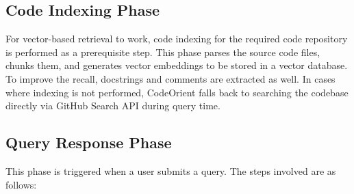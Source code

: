 \subsection{Code Indexing Phase}
For vector-based retrieval to work, code indexing for the required code repository is performed as a prerequisite step. This phase parses the source code files, chunks them, and generates vector embeddings to be stored in a vector database. To improve the recall, docstrings and comments are extracted as well. In cases where indexing is not performed, CodeOrient falls back to searching the codebase directly via GitHub Search API during query time.

\subsection{Query Response Phase}
This phase is triggered when a user submits a query. The steps involved are as follows:
